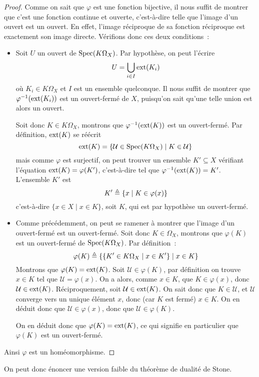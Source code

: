 \begin{proof}
  Comme on sait que $\varphi$ est une fonction bijective, il nous suffit de
  montrer que c'est une fonction continue et ouverte, c'est-à-dire telle que
  l'image d'un ouvert est un ouvert. En effet, l'image réciproque de sa fonction
  réciproque est exactement son image directe. Vérifions donc ces deux
  conditions~:
  \begin{itemize}
  \item Soit $U$ un ouvert de $\operatorname{Spec}(K\Omega_X)$. Par hypothèse, on peut
    l'écrire
    \[U = \bigcup_{i\in I} \operatorname{ext}(K_i)\]
    où $K_i\in K\Omega_X$ et $I$ est un ensemble quelconque. Il nous suffit
    de montrer que $\varphi^{-1}(\operatorname{ext}(K_i))$ est un ouvert-fermé de $X$,
    puisqu'on sait qu'une telle union est alors un ouvert.

    Soit donc $K\in K\Omega_X$, montrons que $\varphi^{-1}(\operatorname{ext}(K))$ est un
    ouvert-fermé. Par définition, $\operatorname{ext}(K)$ se réécrit
    \[\operatorname{ext}(K) = \{\mathcal U \in \operatorname{Spec}(K\Omega_X)\mid K \in \mathcal U\}\]
    mais comme $\varphi$ est surjectif, on peut trouver un ensemble
    $K'\subseteq X$ vérifiant l'équation $\operatorname{ext}(K) = \varphi(K')$, c'est-à-dire
    tel que $\varphi^{-1}(\operatorname{ext}(K)) = K'$. L'ensemble $K'$ est
    \[K' \triangleq \{x \mid K \in \varphi(x)\}\]
    c'est-à-dire $\{x\in X\mid x\in K\}$, soit $K$, qui est par hypothèse
    un ouvert-fermé.
  \item Comme précédemment, on peut se ramener à montrer que l'image d'un
    ouvert-fermé est un ouvert-fermé. Soit donc $K\in\Omega_X$, montrons que
    $\varphi(K)$ est un ouvert-fermé de $\operatorname{Spec}(K\Omega_X)$. Par définition~:
    \[\varphi(K) \triangleq \{\{K' \in K\Omega_X\mid x \in K'\}\mid x \in K\}\]
    Montrons que $\varphi(K) = \operatorname{ext}(K)$. Soit $\mathcal U \in \varphi(K)$,
    par définition on trouve $x\in K$ tel que $\mathcal U = \varphi(x)$.
    On a alors, comme $x\in K$, que $K\in \varphi(x)$, donc
    $\mathcal U \in \operatorname{ext}(K)$. Réciproquement, soit $\mathcal U \in \operatorname{ext}(K)$.
    On sait donc que $K\in \mathcal U$, et $\mathcal U$ converge vers un
    unique élément $x$, donc (car $K$ est fermé) $x\in K$. On en déduit donc
    que $\mathcal U \in\varphi(x)$, donc que $\mathcal U \in \varphi(K)$.

    On en déduit donc que $\varphi(K) = \operatorname{ext}(K)$, ce qui signifie en particulier
    que $\varphi(K)$ est un ouvert-fermé.
  \end{itemize}

  Ainsi $\varphi$ est un homéomorphisme.
\end{proof}

On peut donc énoncer une version faible du théorème de dualité de Stone.

